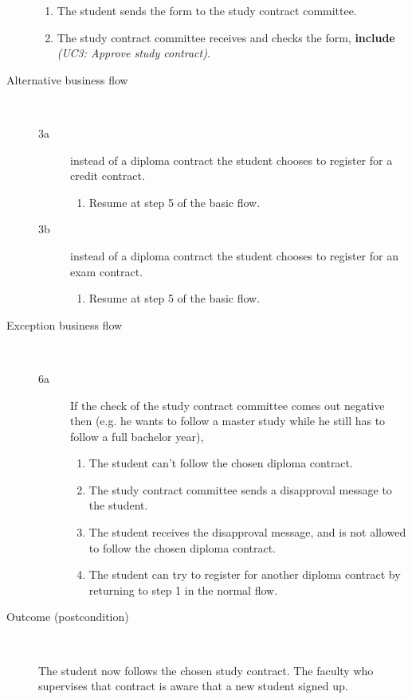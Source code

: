\begin{description}
\begin{enumerate}
	  	\item The student sends the form to the study contract committee.
	  	\item The study contract committee receives and checks the form,
	  	\textbf{include} \emph{(UC3: Approve study contract)}.
	\end{enumerate}
	\item[Alternative business flow] \ 
	\begin{description}
		\item[3a] instead of a diploma contract the student chooses to register for a
		credit contract. 
		\begin{enumerate}
		  \item Resume at step 5 of the basic flow.
		\end{enumerate}
		\item[3b] instead of a diploma contract the student chooses to register for an
		exam contract. 
		\begin{enumerate}
		  \item Resume at step 5 of the basic flow.
		\end{enumerate}
	\end{description}
	\item[Exception business flow] \ 
	\begin{description}
		\item[6a] If the check of the study contract committee comes out negative
		then (e.g. he wants to follow a master study while he still has to follow a
		full bachelor year),
		\begin{enumerate}
		  \item The student can't follow the chosen diploma contract.
		  \item The study contract committee sends a disapproval message to the
		  student.
		  \item The student receives the disapproval message, and is not allowed to
		  follow the chosen diploma contract.
		  \item The student can try to register for another diploma contract by
		  returning to step 1 in the normal flow.
		\end{enumerate}
	\end{description}
	\item[Outcome (postcondition)] \
		\par The student now follows the chosen study contract. The faculty who
		supervises that contract is aware that a new student signed up.
\end{description}
